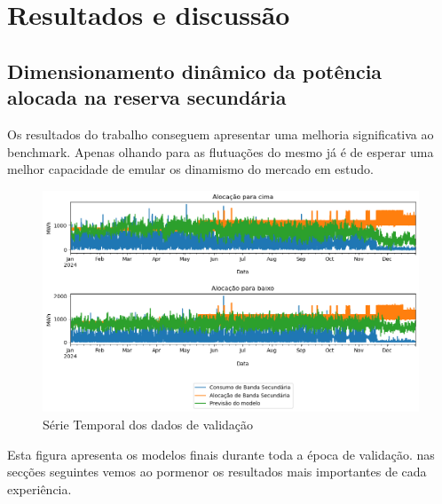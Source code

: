 \chapter{Resultados e discussão}

\thispagestyle{plain}


\section{Dimensionamento dinâmico da potência alocada na reserva secundária}

Os resultados do trabalho conseguem apresentar uma melhoria significativa ao benchmark. Apenas olhando para as flutuações do mesmo já é de esperar uma melhor capacidade de emular os dinamismo do mercado em estudo.\par

\begin{figure}[H]
    \centering
    \includegraphics[width=\textwidth]{plots/alocacoes_finais.png}
    \caption{Série Temporal dos dados de validação}
    \label{fig:modeltimeseries}
\end{figure}

Esta figura apresenta os modelos finais durante toda a época de validação. nas secções seguintes vemos ao pormenor os resultados mais importantes de cada experiência.\par

\thispagestyle{plain}


\thispagestyle{plain}

